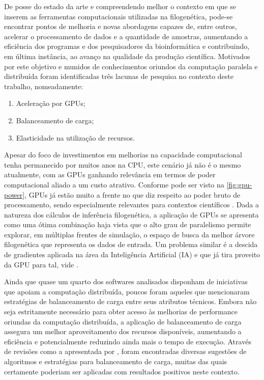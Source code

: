 \documentclass[english,brazilian]{UNISINOSmonografia} %
\begin{document}
De posse do estado da arte e compreendendo melhor o contexto em que se inserem as ferramentas computacionais utilizadas na filogenética, pode-se encontrar pontos de melhoria e novas abordagens capazes de, entre outros, acelerar o processamento de dados e a quantidade de amostras, aumentando a eficiência dos programas e dos pesquisadores da bioinformática e contribuindo, em última instância, ao avanço na qualidade da produção científica.
Motivados por este objetivo e munidos de conhecimentos oriundos da computação paralela e distribuída \cite{Righi2013,Aubin2016,Aubin2017} 
foram identificadas três lacunas de pesquisa no contexto deste trabalho, nomeadamente: 
\begin{enumerate}[label=Lacuna~\arabic*:~,itemindent=*]
	\item Aceleração por GPUs;
	\item Balanceamento de carga;
	\item Elasticidade na utilização de recursos.
\end{enumerate}




Apesar do foco de investimentos em melhorias na capacidade computacional tenha permanecido por muitos anos na CPU, este cenário já não é o mesmo atualmente, com as GPUs ganhando relevância em termos de poder computacional aliado a um custo atrativo.
Conforme pode ser visto na \autoref{fig:gpu-power}, GPUs já estão muito a frente no que diz respeito ao poder bruto de processamento, sendo especialmente relevantes para contextos científicos \cite{Aji2013}.
Dada a natureza dos cálculos de inferência filogenética, a aplicação de GPUs se apresenta como uma ótima combinação haja vista que o alto grau de paralelismo permite explorar, em múltiplas frentes de simulação, o espaço de busca da melhor árvore filogenética que representa os dados de entrada.
Um problema similar é a descida de gradientes aplicada na área da Inteligência Artificial (IA) e que já tira proveito da GPU para tal, vide .




Ainda que quase um quarto dos softwares analisados disponham de iniciativas que apoiam a computação distribuída, poucos foram aqueles que mencionaram estratégias de balanceamento de carga entre seus atributos técnicos.
Embora não seja estritamente necessário para obter acesso às melhorias de performance oriundas da computação distribuída, a aplicação de balanceamento de carga assegura um melhor aproveitamento dos recursos disponíveis, aumentando a eficiência e potencialmente reduzindo ainda mais o tempo de execução.
Através de revisões como a apresentada por , foram encontradas diversas sugestões de algoritmos e estratégias para balanceamento de carga, muitas das quais certamente poderiam ser aplicadas com resultados positivos neste contexto.
\end{document}
